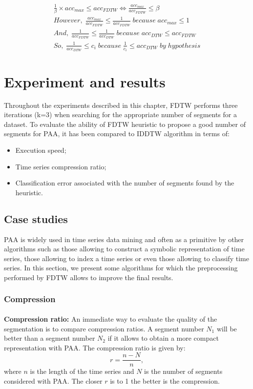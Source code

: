 \begin{eqnarray}
\frac{1}{\beta}\times acc_{max}\leq acc_{FDTW} \Leftrightarrow\frac{acc_{max}}{acc_{FDTW}}\leq \beta \\
However,\; \frac{acc_{max}}{acc_{FDTW}}\leq\frac{1} {acc_{FDTW}}\;because\; acc_{max}\leq 1 \\
And,\; \frac{1}{acc_{FDTW}}\leq\frac{1}{acc_{DTW}} \; because \; acc_{DTW}\leq acc_{FDTW} \\
So,\; \frac{1}{acc_{DTW}}\leq c_{i} \; because \; \frac{1}{c_{i}}\leq acc_{DTW} \; by \; hypothesis
\end{eqnarray}


\section{Experiment and results}
\label{sec:4}
Throughout the experiments described in this chapter, FDTW performs three iterations (k=3) when searching for the appropriate number of segments for a dataset. To evaluate the ability of FDTW heuristic to propose a good number of segments for PAA, it has been compared to IDDTW algorithm in terms of: 

\begin{itemize}
\item Execution speed;
\item Time series compression ratio;
\item Classification error associated with the number of segments found by the heuristic.
\end{itemize}




\subsection{Case studies}

PAA is widely used in time series data mining and often as a primitive by other algorithms such as
those allowing to construct a symbolic representation of time series, those allowing to index a
time series or even those allowing to classify time series. In this section, we present some
algorithms for which the preprocessing performed by FDTW allows to improve the final
results.
\subsubsection{Compression}

\paragraph{}\textbf{Compression ratio: }
An immediate way to evaluate the quality of the segmentation is to compare  compression ratios. A
segment number $N_1$ will be better than a segment number $N_2$ if it allows to obtain a
more compact representation with PAA. The compression ratio is given by:
\[
r=\frac{n-N}{n},
\]
where $n$ is the length of the time series and $N$ is the number of segments considered with PAA. The closer $r$ is to 1 the better is the compression. 

